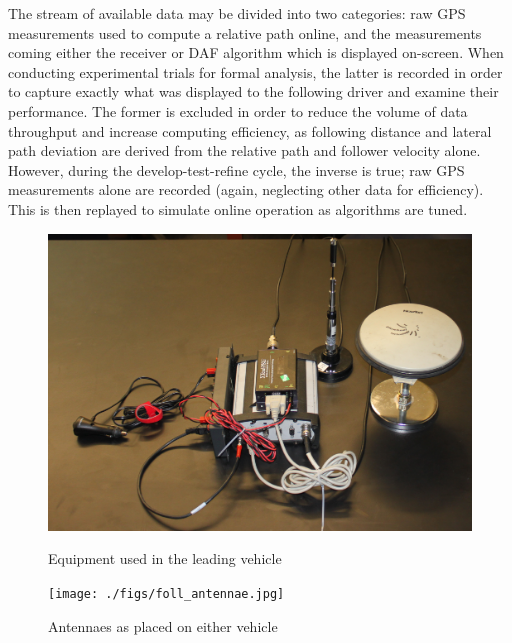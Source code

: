 The stream of available data may be divided into two categories: raw GPS measurements used to compute a relative path online, and the measurements coming either the receiver or DAF algorithm which is displayed on-screen. When conducting experimental trials for formal analysis, the latter is recorded in order to capture exactly what was displayed to the following driver and examine their performance. The former is excluded in order to reduce the volume of data throughput and increase computing efficiency, as following distance and lateral path deviation are derived from the relative path and follower velocity alone. However, during the develop-test-refine cycle, the inverse is true; raw GPS measurements alone are recorded (again, neglecting other data for efficiency). This is then replayed to simulate online operation as algorithms are tuned.

\begin{figure}[ht] \centering
    \begin{minipage}[b]{0.45\linewidth} \centering 
        \includegraphics[width=\textwidth]{./figs/lead_hardware.jpg}
        \caption{Equipment used in the leading vehicle} \label{fig:hardwarelead}
    \end{minipage}
    \hspace{0.5cm}
    \begin{minipage}[b]{0.45\linewidth} \centering
        \texttt{[image: ./figs/foll\_antennae.jpg]} 
        \caption{Antennaes as placed on either vehicle} \label{fig:antennaefoll}
    \end{minipage}
\end{figure}

